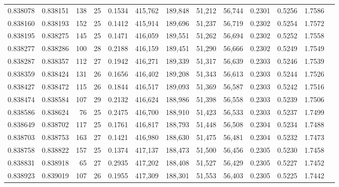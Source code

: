 \begin{tabular}{rrrrrrrrrrrrr}
0.838078 & 0.838151 &   138 &  25 &                                     0.1534 & 415,762 & 189,848 &  51,212 &  56,744 & 0.2301 & 0.5256 & 1.7586 \\
0.838160 & 0.838193 &   152 &  25 &                                     0.1412 & 415,914 & 189,696 &  51,237 &  56,719 & 0.2302 & 0.5254 & 1.7572 \\
0.838195 & 0.838275 &   145 &  25 &                                     0.1471 & 416,059 & 189,551 &  51,262 &  56,694 & 0.2302 & 0.5252 & 1.7558 \\
0.838277 & 0.838286 &   100 &  28 &                                     0.2188 & 416,159 & 189,451 &  51,290 &  56,666 & 0.2302 & 0.5249 & 1.7549 \\
0.838287 & 0.838357 &   112 &  27 &                                     0.1942 & 416,271 & 189,339 &  51,317 &  56,639 & 0.2303 & 0.5246 & 1.7539 \\
0.838359 & 0.838424 &   131 &  26 &                                     0.1656 & 416,402 & 189,208 &  51,343 &  56,613 & 0.2303 & 0.5244 & 1.7526 \\
0.838427 & 0.838472 &   115 &  26 &                                     0.1844 & 416,517 & 189,093 &  51,369 &  56,587 & 0.2303 & 0.5242 & 1.7516 \\
0.838474 & 0.838584 &   107 &  29 &                                     0.2132 & 416,624 & 188,986 &  51,398 &  56,558 & 0.2303 & 0.5239 & 1.7506 \\
0.838586 & 0.838624 &    76 &  25 &                                     0.2475 & 416,700 & 188,910 &  51,423 &  56,533 & 0.2303 & 0.5237 & 1.7499 \\
0.838649 & 0.838702 &   117 &  25 &                                     0.1761 & 416,817 & 188,793 &  51,448 &  56,508 & 0.2304 & 0.5234 & 1.7488 \\
0.838703 & 0.838753 &   163 &  27 &                                     0.1421 & 416,980 & 188,630 &  51,475 &  56,481 & 0.2304 & 0.5232 & 1.7473 \\
0.838758 & 0.838822 &   157 &  25 &                                     0.1374 & 417,137 & 188,473 &  51,500 &  56,456 & 0.2305 & 0.5230 & 1.7458 \\
0.838831 & 0.838918 &    65 &  27 &                                     0.2935 & 417,202 & 188,408 &  51,527 &  56,429 & 0.2305 & 0.5227 & 1.7452 \\
0.838923 & 0.839019 &   107 &  26 &                                     0.1955 & 417,309 & 188,301 &  51,553 &  56,403 & 0.2305 & 0.5225 & 1.7442 \\

\end{tabular}
